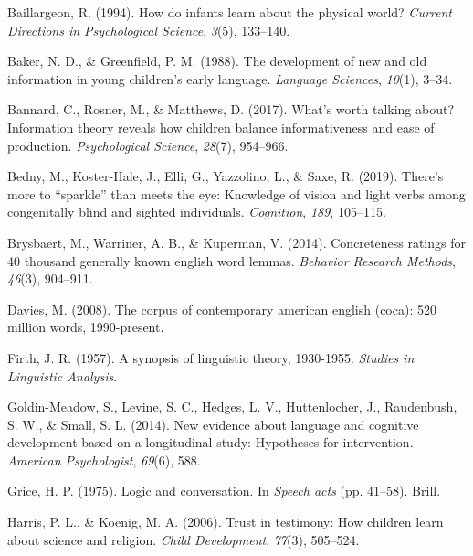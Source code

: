 \documentclass[10pt, letterpaper]{article}
\newlength{\cslhangindent}
\newenvironment{cslreferences}%
  {\setlength{\parindent}{0pt}%
  \everypar{\setlength{\hangindent}{\cslhangindent}}\ignorespaces}%
  {\par}
\begin{document}
\hypertarget{refs}{}
\begin{cslreferences}
\leavevmode\hypertarget{ref-baillargeon1994}{}%
Baillargeon, R. (1994). How do infants learn about the physical world?
\emph{Current Directions in Psychological Science}, \emph{3}(5),
133--140.

\leavevmode\hypertarget{ref-baker1988}{}%
Baker, N. D., \& Greenfield, P. M. (1988). The development of new and
old information in young children's early language. \emph{Language
Sciences}, \emph{10}(1), 3--34.

\leavevmode\hypertarget{ref-bannard2017}{}%
Bannard, C., Rosner, M., \& Matthews, D. (2017). What's worth talking
about? Information theory reveals how children balance informativeness
and ease of production. \emph{Psychological Science}, \emph{28}(7),
954--966.

\leavevmode\hypertarget{ref-bedny2019}{}%
Bedny, M., Koster-Hale, J., Elli, G., Yazzolino, L., \& Saxe, R. (2019).
There's more to ``sparkle'' than meets the eye: Knowledge of vision and
light verbs among congenitally blind and sighted individuals.
\emph{Cognition}, \emph{189}, 105--115.

\leavevmode\hypertarget{ref-brysbaert2014}{}%
Brysbaert, M., Warriner, A. B., \& Kuperman, V. (2014). Concreteness
ratings for 40 thousand generally known english word lemmas.
\emph{Behavior Research Methods}, \emph{46}(3), 904--911.

\leavevmode\hypertarget{ref-davies2008}{}%
Davies, M. (2008). The corpus of contemporary american english (coca):
520 million words, 1990-present.

\leavevmode\hypertarget{ref-firth1957}{}%
Firth, J. R. (1957). A synopsis of linguistic theory, 1930-1955.
\emph{Studies in Linguistic Analysis}.

\leavevmode\hypertarget{ref-goldin-meadow2014}{}%
Goldin-Meadow, S., Levine, S. C., Hedges, L. V., Huttenlocher, J.,
Raudenbush, S. W., \& Small, S. L. (2014). New evidence about language
and cognitive development based on a longitudinal study: Hypotheses for
intervention. \emph{American Psychologist}, \emph{69}(6), 588.

\leavevmode\hypertarget{ref-grice1975}{}%
Grice, H. P. (1975). Logic and conversation. In \emph{Speech acts} (pp.
41--58). Brill.

\leavevmode\hypertarget{ref-harris2006}{}%
Harris, P. L., \& Koenig, M. A. (2006). Trust in testimony: How children
learn about science and religion. \emph{Child Development},
\emph{77}(3), 505--524.


\end{cslreferences}
\end{document}
